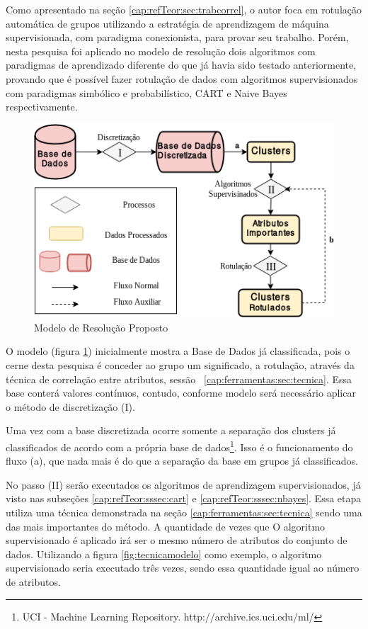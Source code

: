 Como apresentado na seção \ref{cap:refTeor:sec:trabcorrel}, o autor  foca em rotulação automática de grupos utilizando a estratégia de aprendizagem de máquina supervisionada, com paradigma conexionista, para provar seu trabalho. Porém, nesta pesquisa foi aplicado no modelo de resolução  dois algoritmos com paradigmas de aprendizado diferente do que já havia sido testado anteriormente, provando que é possível fazer rotulação de dados com  algoritmos supervisionados com paradigmas simbólico e probabilístico, CART e Naive Bayes respectivamente.


\begin{figure}[h!]
        \centering
        \includegraphics[scale=0.7]{figs/modeloResolucao.png}
        \caption{Modelo de Resolução Proposto} \label{fig:modeloresolucao}
\end{figure}

O modelo (figura \ref{fig:modeloresolucao}) inicialmente mostra a Base de Dados  já classificada, pois o cerne desta pesquisa é conceder ao grupo um significado, a rotulação,  através da técnica de correlação entre atributos, sessão ~\ref{cap:ferramentas:sec:tecnica}. Essa base  conterá  valores contínuos, contudo, conforme modelo será necessário aplicar o método de discretização (I).

Uma vez com a base discretizada ocorre somente a separação dos clusters já classificados de acordo com a própria base de dados\footnote{UCI - Machine Learning Repository. http://archive.ics.uci.edu/ml/ }. Isso é o funcionamento do fluxo (a), que nada mais é do que a separação da base em grupos já classificados.

No passo (II) serão executados os algoritmos de aprendizagem supervisionados, já visto nas subseções \ref{cap:refTeor:sssec:cart} e \ref{cap:refTeor:sssec:nbayes}. Essa etapa utiliza uma técnica demonstrada na seção  \ref{cap:ferramentas:sec:tecnica} sendo uma das mais importantes do método. A quantidade de vezes que O algoritmo supervisionado é aplicado irá ser o mesmo número de atributos do conjunto de dados. Utilizando a figura \ref{fig:tecnicamodelo} como exemplo, o algoritmo supervisionado seria executado três vezes, sendo essa quantidade igual ao número de atributos. 

